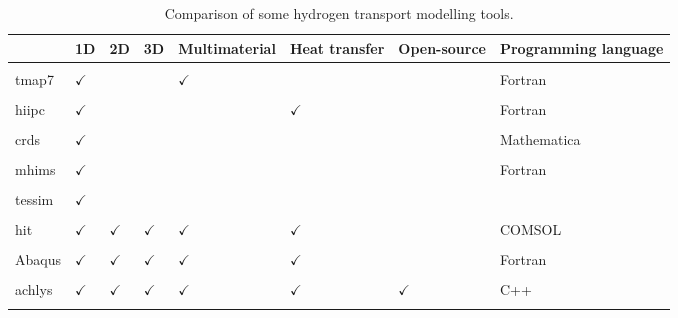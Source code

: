 \begin{table} [h]
    \centering
    \begin{tabular}{L{2cm} L{0.5cm} L{0.5cm} L{0.6cm} L{1.7cm} l l l }
        & 1D & 2D & 3D & Multimaterial & Heat transfer & Open-source & Programming language \\
        \hline \\
        \acrshort{tmap7} \cite{longhurst_tmap7_2008} & $\checkmark$ & & & $\checkmark$ & & & Fortran\\
        \\
        \acrshort{hiipc} \cite{sang_modelling_2012} & $\checkmark$ & & & & $\checkmark$ & & Fortran\\
        \\
        \acrshort{crds} \cite{matveev_reaction-diffusion_2018} & $\checkmark$ & & & & & & Mathematica \\
        \\
        \acrshort{mhims} \cite{hodille_study_2016} & $\checkmark$ & & & & & & Fortran \\
        \\
        \acrshort{tessim} \cite{schmid_transport_2014} & $\checkmark$ & & & & & & \\
        \\
        \acrshort{hit} \cite{candido_integrated_2020} & $\checkmark$ & $\checkmark$ & $\checkmark$ & $\checkmark$ & $\checkmark$ & & COMSOL\\
        \\
        Abaqus \cite{benannoune_multidimensional_2020} & $\checkmark$ & $\checkmark$ & $\checkmark$ & $\checkmark$ & $\checkmark$ & & Fortran\\
        \\
        \gls{achlys} \cite{stephen-dixon_aurora-multiphysicsachlys_2021} & $\checkmark$ & $\checkmark$ & $\checkmark$ & $\checkmark$ & $\checkmark$ & $\checkmark$ & C++\\
        \\
    \end{tabular}
    \caption{Comparison of some hydrogen transport modelling tools.}
\end{table}

